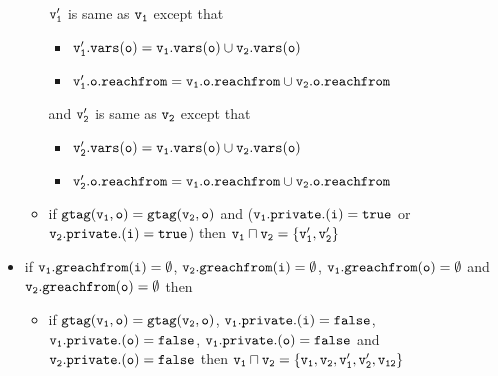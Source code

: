 \begin{itemize}
\begin{itemize}
     $\tt v_1'$ is same as $\tt v_1$ except that 
    \begin{itemize}
  \item  $\tt v_1'.vars(o) = v_1.vars(o) \cup v_2.vars(o)$
  \item $\tt v_1'.o.reachfrom = v_{1}.o.reachfrom \cup v_{2}.o.reachfrom$
    \end{itemize}
   and $\tt v_2'$ is same as $\tt v_2$ except that 
    \begin{itemize}
  \item  $\tt v_2'.vars(o) = v_1.vars(o) \cup v_2.vars(o)$
  \item $\tt v_2'.o.reachfrom = v_{1}.o.reachfrom \cup v_{2}.o.reachfrom$
    \end{itemize}
     \item if $\tt gtag(v_1, o) = gtag(v_2, o)$ and ($\tt v_1.private.(i) = true$ or $\tt v_2.private.(i) = true$) then $\tt v_1 \sqcap v_2 = \{v_1', v_2'\}$ 
 \end{itemize}
 
 
 
 
 
 
 
 
 \item if $\tt v_1.greachfrom(i) = \emptyset$, $\tt v_2.greachfrom(i) = \emptyset$, $\tt v_1.greachfrom(o) = \emptyset$ and $\tt v_2.greachfrom(o) = \emptyset$ then 
 \begin{itemize}
 \item if $\tt gtag(v_1, o) = gtag(v_2, o)$, $\tt v_1.private.(i) = false$, $\tt v_1.private.(o) = false$, $\tt v_1.private.(o) = false$ and $\tt v_2.private.(o) = false$ then  $\tt v_1 \sqcap v_2 = \{v_1,v_2,v_1',v_2',v_{12}\}$ %
    

\end{itemize}
\end{itemize}
